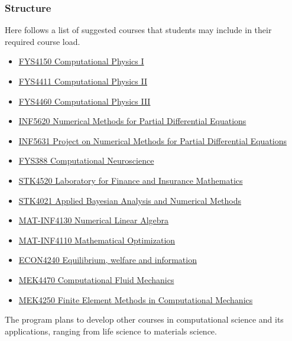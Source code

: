 \documentclass{beamer}
\begin{document}
\begin{frame}
\frametitle{Structure}

\begin{block}{}
Here follows a list of suggested courses that students may include in their required course load.

\begin{itemize}
\item \href{{http://www.uio.no/studier/emner/matnat/fys/FYS4150/index-eng.html}}{FYS4150 Computational Physics I}

\item \href{{http://www.uio.no/studier/emner/matnat/fys/FYS4411/}}{FYS4411 Computational Physics II}

\item \href{{http://www.uio.no/studier/emner/matnat/fys/FYS4460/}}{FYS4460 Computational Physics III}

\item \href{{http://www.uio.no/studier/emner/matnat/ifi/INF5620/index-eng.html}}{INF5620 Numerical Methods for Partial Differential Equations}

\item \href{{http://www.uio.no/studier/emner/matnat/ifi/INF5631/index-eng.html}}{INF5631 Project on Numerical Methods for Partial Differential Equations}

\item \href{{http://www.nmbu.no/course/FYS388}}{FYS388 Computational Neuroscience}

\item \href{{http://www.uio.no/studier/emner/matnat/math/STK4520/index-eng.html}}{STK4520 Laboratory for Finance and Insurance Mathematics}

\item \href{{http://www.uio.no/studier/emner/matnat/math/STK4021/index-eng.html}}{STK4021 Applied Bayesian Analysis and Numerical Methods}

\item \href{{http://www.uio.no/studier/emner/matnat/math/MAT-INF4130/index-eng.html}}{MAT-INF4130  Numerical Linear Algebra}

\item \href{{http://www.uio.no/studier/emner/matnat/math/MAT-INF4110/index.html}}{MAT-INF4110 Mathematical Optimization}

\item \href{{http://www.uio.no/studier/emner/sv/oekonomi/ECON4240/index.html}}{ECON4240 Equilibrium, welfare and information}

\item \href{{http://www.uio.no/studier/emner/matnat/math/MEK4470/index-eng.html}}{MEK4470  Computational Fluid Mechanics}

\item \href{{http://www.uio.no/studier/emner/matnat/math/MEK4250/index-eng.html}}{MEK4250 Finite Element Methods in Computational Mechanics}
\end{itemize}

\noindent
The program plans to develop other courses in computational science and its applications, ranging from life science to materials science.
\end{block}
\end{frame}
\end{document}
